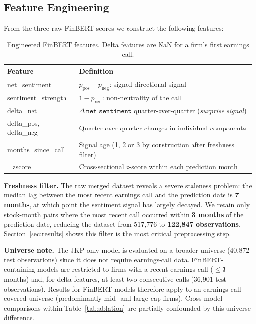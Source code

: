 \subsection{Feature Engineering}

From the three raw FinBERT scores we construct the following features:

\begin{table}[H]
\centering
\caption{Engineered FinBERT features. Delta features are NaN for a firm's first earnings call.}
\label{tab:features}
\setlength{\tabcolsep}{6pt}
\begin{tabular}{>{\ttfamily}l p{9cm}}
\toprule
\normalfont\textbf{Feature} & \textbf{Definition} \\
\midrule
net\_sentiment      & $p_\text{pos} - p_\text{neg}$: signed directional signal \\
sentiment\_strength & $1 - p_\text{neu}$: non-neutrality of the call \\
delta\_net          & $\Delta\,\texttt{net\_sentiment}$ quarter-over-quarter (\textit{surprise signal}) \\
delta\_pos, delta\_neg & Quarter-over-quarter changes in individual components \\
months\_since\_call & Signal age (1, 2 or 3 by construction after freshness filter) \\
*\_zscore           & Cross-sectional z-score within each prediction month \\
\bottomrule
\end{tabular}
\end{table}

\textbf{Freshness filter.} The raw merged dataset reveals a severe staleness problem: the median lag between the most recent earnings call and the prediction date is \textbf{7 months}, at which point the sentiment signal has largely decayed. We retain only stock-month pairs where the most recent call occurred within \textbf{3 months} of the prediction date, reducing the dataset from 517,776 to \textbf{122,847 observations}. Section~\ref{sec:results} shows this filter is the most critical preprocessing step.

\textbf{Universe note.} The JKP-only model is evaluated on a broader universe (40,872 test observations) since it does not require earnings-call data. FinBERT-containing models are restricted to firms with a recent earnings call ($\leq$3 months) and, for delta features, at least two consecutive calls (36,901 test observations). Results for FinBERT models therefore apply to an earnings-call-covered universe (predominantly mid- and large-cap firms). Cross-model comparisons within Table~\ref{tab:ablation} are partially confounded by this universe difference.

